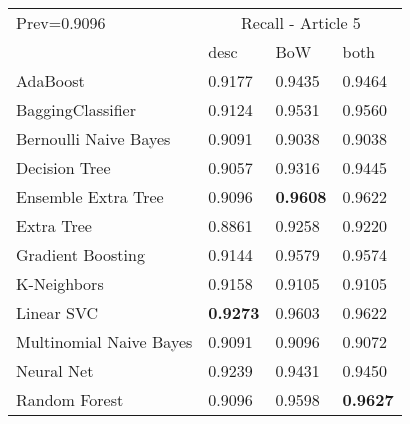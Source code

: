 \begin{tabular}{|l|l|l|l| }
\hline
Prev=0.9096 &  \multicolumn{3}{c|}{Recall - Article 5} \\
\cline{2-4} & desc & BoW & both \\ \hline
AdaBoost                & 0.9177 & 0.9435 & 0.9464\\
BaggingClassifier       & 0.9124 & 0.9531 & 0.9560\\
Bernoulli Naive Bayes   & 0.9091 & 0.9038 & 0.9038\\
Decision Tree           & 0.9057 & 0.9316 & 0.9445\\
Ensemble Extra Tree     & 0.9096 & {\bf 0.9608} & 0.9622\\
Extra Tree              & 0.8861 & 0.9258 & 0.9220\\
Gradient Boosting       & 0.9144 & 0.9579 & 0.9574\\
K-Neighbors             & 0.9158 & 0.9105 & 0.9105\\
Linear SVC              & {\bf 0.9273} & 0.9603 & 0.9622\\
Multinomial Naive Bayes & 0.9091 & 0.9096 & 0.9072\\
Neural Net              & 0.9239 & 0.9431 & 0.9450\\
Random Forest           & 0.9096 & 0.9598 & {\bf 0.9627}\\
\hline
\end{tabular}